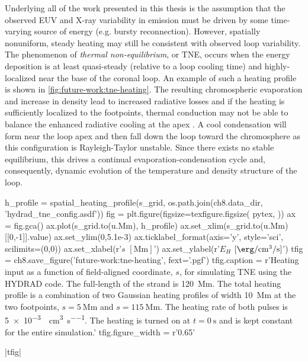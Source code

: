 Underlying all of the work presented in this thesis is the assumption that the observed EUV and X-ray variability in \AR{} emission must be driven by some time-varying source of energy (e.g. bursty reconnection). However, spatially nonuniform, steady heating may still be consistent with observed loop variability. The phenomenon of \textit{thermal non-equilibrium}, or TNE, occurs when the energy deposition is at least quasi-steady (relative to a loop cooling time) and highly-localized near the base of the coronal loop. An example of such a heating profile is shown in \autoref{fig:future-work:tne-heating}. The resulting chromospheric evaporation and increase in density lead to increased radiative losses and if the heating is sufficiently localized to the footpoints, thermal conduction may not be able to balance the enhanced radiative cooling at the apex \citep{kuin_thermal_1982,antiochos_model_1991}. A cool condensation will form near the loop apex and then fall down the loop toward the chromosphere as this configuration is Rayleigh-Taylor unstable. Since there exists no stable equilibrium, this drives a continual evaporation-condensation cycle and, consequently, dynamic evolution of the temperature and density structure of the loop.

\begin{pycode}[chapter8]
h_profile = spatial_heating_profile(s_grid, os.path.join(ch8.data_dir, 'hydrad_tne_config.asdf'))
fig = plt.figure(figsize=texfigure.figsize(
    pytex,
))
ax = fig.gca()
ax.plot(s_grid.to(u.Mm), h_profile)
ax.set_xlim(s_grid.to(u.Mm)[[0,-1]].value)
ax.set_ylim(0,5.1e-3)
ax.ticklabel_format(axis='y', style='sci', scilimits=(0,0))
ax.set_xlabel(r'$s$ $[\si{\mega\m}]$')
ax.set_ylabel(r'$E_H$ $[\si{\erg\per\cubic\cm\per\second}]$')
tfig = ch8.save_figure('future-work:tne-heating', fext='.pgf')
tfig.caption = r'Heating input as a function of field-aligned coordinate, $s$, for simulating TNE using the HYDRAD code. The full-length of the strand is \SI{120}{\mega\m}. The total heating profile is a combination of two Gaussian heating profiles of width \SI{10}{\mega\m} at the two footpoints, $s=\SI{5}{\mega\m}$ and $s=\SI{115}{\mega\m}$. The heating rate of both pulses is \SI{5e-3}{\erg\per\cubic\cm\per\second}. The heating is turned on at $t=\SI{0}{\second}$ and is kept constant for the entire simulation.'
tfig.figure_width = r'0.65\textwidth'
\end{pycode}
\py[chapter8]|tfig|

